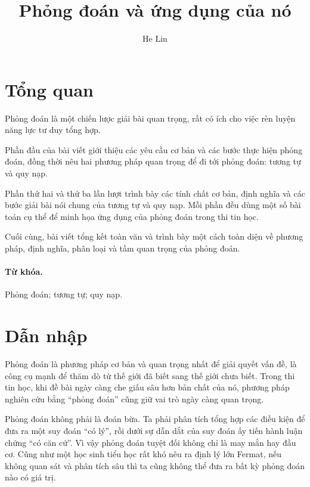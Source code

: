 \documentclass[11pt]{article}
\title{Phỏng đoán và ứng dụng của nó}
\author{He Lin}
\date{}
\begin{document}
\maketitle


\section*{Tổng quan}

Phỏng đoán là một chiến lược giải bài quan trọng, rất có ích cho việc rèn
luyện năng lực tư duy tổng hợp.

Phần đầu của bài viết giới thiệu các yêu cầu cơ bản và các bước thực hiện
phỏng đoán, đồng thời nêu hai phương pháp quan trọng để đi tới phỏng đoán:
tương tự và quy nạp.

Phần thứ hai và thứ ba lần lượt trình bày các tính chất cơ bản, định nghĩa và
các bước giải bài nói chung của tương tự và quy nạp. Mỗi phần đều dùng một số
bài toán cụ thể để minh họa ứng dụng của phỏng đoán trong thi tin học.

Cuối cùng, bài viết tổng kết toàn văn và trình bày một cách toàn diện về
phương pháp, định nghĩa, phân loại và tầm quan trọng của phỏng đoán.

\paragraph{Từ khóa.}
Phỏng đoán; tương tự; quy nạp.

\tableofcontents

\section{Dẫn nhập}

Phỏng đoán là phương pháp cơ bản và quan trọng nhất để giải quyết vấn đề, là
công cụ mạnh để thăm dò từ thế giới đã biết sang thế giới chưa biết. Trong
thi tin học, khi đề bài ngày càng che giấu sâu hơn bản chất của nó, phương
pháp nghiên cứu bằng ``phỏng đoán'' cũng giữ vai trò ngày càng quan trọng.

Phỏng đoán không phải là đoán bừa. Ta phải phân tích tổng hợp các điều kiện
để đưa ra một suy đoán ``có lý'', rồi dưới sự dẫn dắt của suy đoán ấy tiến
hành luận chứng ``có căn cứ''. Vì vậy phỏng đoán tuyệt đối không chỉ là may
mắn hay đầu cơ. Cũng như một học sinh tiểu học rất khó nêu ra định lý lớn
Fermat, nếu không quan sát và phân tích sâu thì ta cũng không thể đưa ra bất
kỳ phỏng đoán nào có giá trị.
\end{document}
